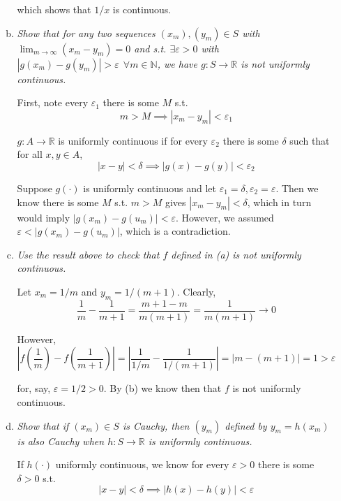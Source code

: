 \documentclass{article}
\begin{document}
\begin{enumerate}[1.]
\begin{enumerate}[a)]
        which shows that $1/x$ is continuous.

      \item \textit{Show that for any two sequences $(x_m), (y_m) \in S$ with $\lim_{m \to \infty} (x_m - y_m) = 0$ and s.t. $\exists \varepsilon > 0$ with $|g(x_m) - g(y_m)| > \varepsilon ~~ \forall m \in \mathbb{N}$, we have $g: S \to \mathbb{R}$ is not uniformly continuous.}

        \solution First, note every $\varepsilon_1$ there is some $M$ s.t.
        \[
            m > M \implies |x_m - y_m| < \varepsilon_1
        \]

        $g: A \to \mathbb{R}$ is uniformly continuous if for every $\varepsilon_2$ there is some $\delta$ such that for all $x, y \in A$,
        \[
            |x - y| < \delta \implies |g(x) - g(y)| < \varepsilon_2
        \]

        Suppose $g(\cdot)$ is uniformly continuous and let $\varepsilon_1 = \delta, \varepsilon_2 = \varepsilon$. Then we know there is some $M$ s.t. $m > M$ gives $|x_m - y_m| < \delta$, which in turn would imply $|g(x_m) - g(u_m)| < \varepsilon$. However, we assumed $\varepsilon < |g(x_m) - g(u_m)|$, which is a contradiction.

      \item \textit{Use the result above to check that $f$ defined in (a) is not uniformly continuous.}

        \solution Let $x_m = 1 / m$ and $y_m = 1 / (m + 1)$. Clearly,
        \[
          \dfrac{1}{m} - \dfrac{1}{m + 1}
          =
          \dfrac{m + 1 - m}{m (m + 1)}
          =
          \dfrac{1}{m (m + 1)}
          \to
          0
        \]

        However,
        \[
          \left|f\left(\dfrac{1}{m}\right) - f\left(\dfrac{1}{m + 1}\right)\right|
          =
          \left|\dfrac{1}{1 / m} - \dfrac{1}{1 / (m + 1)}\right|
          =
          \left|m - (m + 1)\right|
          =
          1
          >
          \varepsilon
        \]

        for, say, $\varepsilon = 1 / 2 > 0$. By (b) we know then that $f$ is not uniformly continuous.

      \item \textit{Show that if $(x_m) \in S$ is Cauchy, then $(y_m)$ defined by $y_m = h(x_m)$ is also Cauchy when $h: S \to \mathbb{R}$ is uniformly continuous.}

        \solution If $h(\cdot)$ uniformly continuous, we know for every $\varepsilon > 0$ there is some $\delta > 0$ s.t.
        \[
          |x - y| < \delta \implies |h(x) - h(y)| < \varepsilon
        \]


\end{enumerate}
\end{enumerate}
\end{document}
